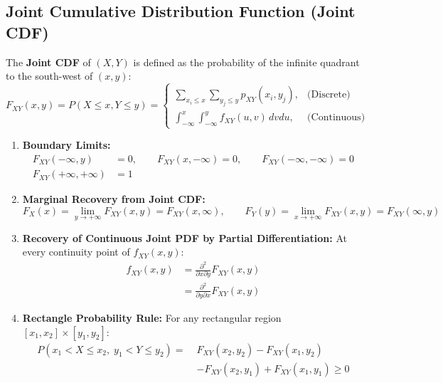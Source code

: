 \documentclass[12pt,a4paper]{article}
\begin{document}
\subsection{Joint Cumulative Distribution Function (Joint CDF)}
The \textbf{Joint CDF} of $(X, Y)$ is defined as the probability of the infinite quadrant to the south-west of $(x, y)$:
\begin{equation}
  F_{XY}(x, y) = P(X \le x, Y \le y) =
  \begin{cases}
    \displaystyle\sum_{x_i \le x} \sum_{y_j \le y} p_{XY}(x_i, y_j), & \text{(Discrete)} \\[10pt]
    \displaystyle\int_{-\infty}^x \int_{-\infty}^y f_{XY}(u, v) \, dv du, & \text{(Continuous)}
  \end{cases}
\end{equation}

\begin{tcolorbox}[formulabox, title={\textbf{Properties of the Joint CDF and Recovery of Joint PDF}}]
\begin{enumerate}[leftmargin=*, itemsep=3pt]
  \item \textbf{Boundary Limits:}
  \begin{align}
    F_{XY}(-\infty, y) &= 0, \qquad F_{XY}(x, -\infty) = 0, \qquad F_{XY}(-\infty, -\infty) = 0 \\[2pt]
    F_{XY}(+\infty, +\infty) &= 1
  \end{align}
  \item \textbf{Marginal Recovery from Joint CDF:}
  \begin{equation}
    F_X(x) = \lim_{y \to +\infty} F_{XY}(x, y) = F_{XY}(x, \infty), \qquad F_Y(y) = \lim_{x \to +\infty} F_{XY}(x, y) = F_{XY}(\infty, y)
  \end{equation}
  \item \textbf{Recovery of Continuous Joint PDF by Partial Differentiation:}
  At every continuity point of $f_{XY}(x, y)$:
  \begin{equation}
    \begin{aligned}
      f_{XY}(x, y) &= \frac{\partial^2}{\partial x \partial y} F_{XY}(x, y) \\[3pt]
      &= \frac{\partial^2}{\partial y \partial x} F_{XY}(x, y)
    \end{aligned}
  \end{equation}
  \item \textbf{Rectangle Probability Rule:} For any rectangular region $[x_1, x_2] \times [y_1, y_2]$:
  \begin{align}
    P(x_1 < X \le x_2, \; y_1 < Y \le y_2) = \; & F_{XY}(x_2, y_2) - F_{XY}(x_1, y_2) \nonumber \\[2pt]
                                                & - F_{XY}(x_2, y_1) + F_{XY}(x_1, y_1) \ge 0
  \end{align}
\end{enumerate}
\end{tcolorbox}
\end{document}
